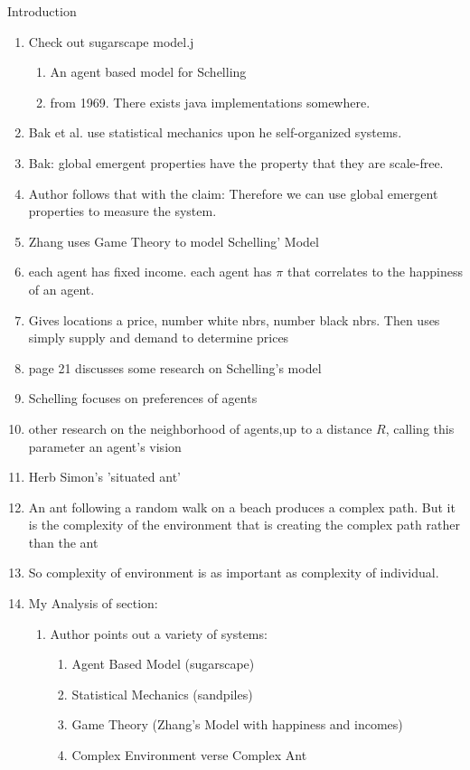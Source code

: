 \documentclass[11pt]{article}
\begin{document}
Introduction
\begin{enumerate}
\item Check out sugarscape model.j
    \begin{enumerate}
        \item An agent based model for Schelling
        \item from 1969. There exists java implementations somewhere. 
    \end{enumerate}
\item Bak et al. use statistical mechanics upon he self-organized systems.
\item Bak: global emergent properties have the property that they are scale-free. 
\item Author follows that with the claim: Therefore we can use global emergent properties to measure the system.
\item Zhang uses Game Theory to model Schelling' Model
\item each agent has fixed income. each agent has $\pi$ that correlates to the happiness of an agent.
\item Gives locations a price, number white nbrs, number black nbrs. Then uses simply supply and demand to determine prices 
\item page 21 discusses some research on Schelling's model
\item Schelling focuses on preferences of agents
\item other research on the neighborhood of agents,up to a distance $R$, calling this parameter an agent's vision
\item Herb Simon's 'situated ant'
\item An ant following a random walk on a beach produces a complex path. But it is the complexity of the environment that is creating the complex path rather than the ant
\item So complexity of environment is as important as complexity of individual. 
\item My Analysis of section:
    \begin{enumerate}
        \item Author points out a variety of systems:
            \begin{enumerate}
                \item Agent Based Model (sugarscape)
                \item Statistical Mechanics (sandpiles)
                \item Game Theory (Zhang's Model with happiness and incomes)
                \item Complex Environment verse Complex Ant
            \end{enumerate}
    \end{enumerate}
\end{enumerate}
\end{document}
